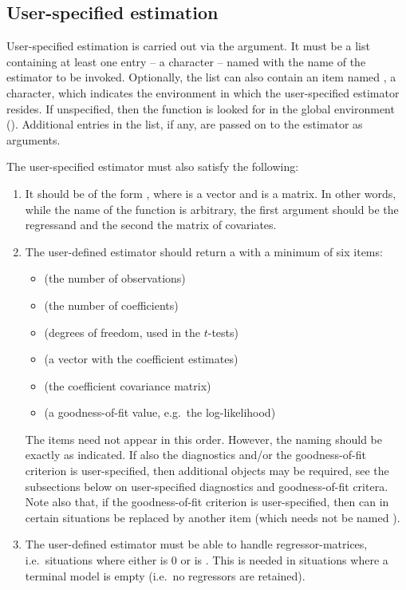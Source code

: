 \subsection{User-specified estimation}

User-specified estimation is carried out via the  argument. It must be a list containing at least one entry -- a character -- named  with the name of the estimator to be invoked. Optionally, the list can also contain an item named , a character, which indicates the environment in which the user-specified estimator resides. If unspecified, then the function is looked for in the global environment (). Additional entries in the list, if any, are passed on to the estimator as arguments.

The user-specified estimator must also satisfy the following:
%
\begin{enumerate}
	\item It should be of the form , where  is a vector and  is a matrix. In other words, while the name of the function is arbitrary, the first argument should be the regressand and the second the matrix of covariates.
	
	\item The user-defined estimator should return a  with a minimum of six items:
	\begin{itemize}
		\item {} (the number of observations)
		\item {} (the number of coefficients)
		\item {} (degrees of freedom, used in the $t$-tests)
		\item {} (a vector with the coefficient estimates)
		\item {} (the coefficient covariance matrix)
		\item {} (a goodness-of-fit value, e.g.\ the log-likelihood)
	\end{itemize}
	The items need not appear in this order. However, the naming should be exactly as indicated. If also the diagnostics and/or the goodness-of-fit criterion is user-specified, then additional objects may be required, see the subsections below on user-specified diagnostics and goodness-of-fit critera. Note also that, if the goodness-of-fit criterion is user-specified, then  can in certain situations be replaced by another item (which needs not be named ). 
	
	\item The user-defined estimator must be able to handle  regressor-matrices, i.e.\ situations where either  is 0 or  is . This is needed in situations where a terminal model is empty (i.e.\ no regressors are retained).
\end{enumerate}
